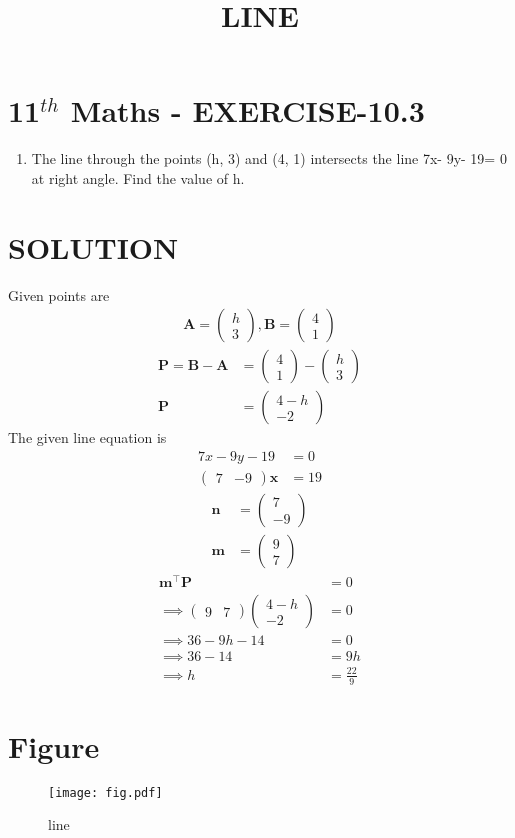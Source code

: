 \documentclass[12pt]{article}
\newcommand{\myvec}[1]{\ensuremath{\begin{pmatrix}#1\end{pmatrix}}}
\let\vec\mathbf
\begin{document}
\begin{center}
\title{\textbf{LINE}}
\date{\vspace{-5ex}} %
\maketitle
\end{center}

\section{11$^{th}$ Maths - EXERCISE-10.3}
\begin{enumerate}
\item The line through the points (h, 3) and (4, 1) intersects the line 7x- 9y- 19= 0 at right angle. Find the value of h.
\end{enumerate}
\section{SOLUTION}
Given points are 
\begin{align}
\vec{A}=\myvec{h\\ 3},\vec{B}=\myvec{4\\ 1}
\end{align}
\begin{align}
\vec{P}=\vec{B}-\vec{A}&=\myvec{4\\ 1}-\myvec{h\\ 3}\\
\vec{P}&=\myvec{4-h\\ -2}
\end{align}
The given line equation is 
\begin{align}
7x-9y-19&=0\\
\myvec{7& -9}\vec{x}&=19
\end{align}
\begin{align}
\vec{n}&=\myvec{7\\ -9}\\
\vec{m}&=\myvec{9\\ 7}
\end{align}
\begin{align}
\vec{m}^\top\vec{P}&=0\\
\implies\myvec{9& 7}\myvec{4-h\\ -2}&=0\\
\implies 36-9h-14&=0\\
\implies 36-14&=9h\\
\implies h&=\frac{22}{9}
\end{align}
\section{Figure}
\begin{figure}[h]
\centering
\texttt{[image: fig.pdf]}
\caption{line}
		\label{fig:Figure}
\end{figure}
\end{document}
